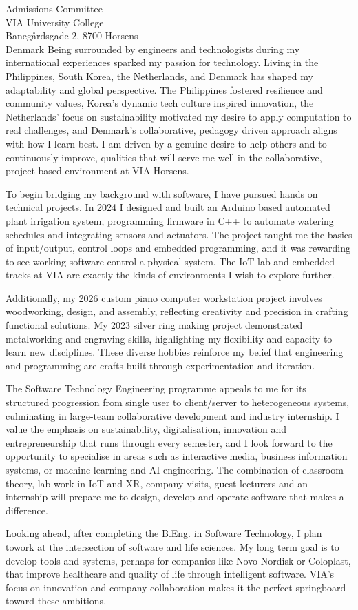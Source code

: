 \documentclass[11pt,a4paper]{letter}
\begin{document}
\begin{letter}{Admissions Committee \\ VIA University College \\ Banegårdsgade 2, 8700 Horsens \\ Denmark}
Being surrounded by engineers and technologists during my international experiences sparked my passion for technology. Living in the Philippines, South Korea, the Netherlands, and Denmark has shaped my adaptability and global perspective. The Philippines fostered resilience and community values, Korea's dynamic tech culture inspired innovation, the Netherlands' focus on sustainability motivated my desire to apply computation to real challenges, and Denmark's collaborative, pedagogy driven approach aligns with how I learn best. I am driven by a genuine desire to help others and to continuously improve, qualities that will serve me well in the collaborative, project based environment at VIA Horsens.

To begin bridging my background with software, I have pursued hands on technical projects. In 2024 I designed and built an Arduino based automated plant irrigation system, programming firmware in C++ to automate watering schedules and integrating sensors and actuators. The project taught me the basics of input/output, control loops and embedded programming, and it was rewarding to see working software control a physical system. The IoT lab and embedded tracks at VIA are exactly the kinds of environments I wish to explore further.

Additionally, my 2026 custom piano computer workstation project involves woodworking, design, and assembly, reflecting creativity and precision in crafting functional solutions. My 2023 silver ring making project demonstrated metalworking and engraving skills, highlighting my flexibility and capacity to learn new disciplines. These diverse hobbies reinforce my belief that engineering and programming are crafts built through experimentation and iteration.

The Software Technology Engineering programme appeals to me for its structured progression from single user to client/server to heterogeneous systems, culminating in large-team collaborative development and industry internship. I value the emphasis on sustainability, digitalisation, innovation and entrepreneurship that runs through every semester, and I look forward to the opportunity to specialise in areas such as interactive media, business information systems, or machine learning and AI engineering. The combination of classroom theory, lab work in IoT and XR, company visits, guest lecturers and an internship will prepare me to design, develop and operate software that makes a difference.

Looking ahead, after completing the B.Eng. in Software Technology, I plan towork at the intersection of software and life sciences. My long term goal is to develop tools and systems, perhaps for companies like Novo Nordisk or Coloplast, that improve healthcare and quality of life through intelligent software. VIA's focus on innovation and company collaboration makes it the perfect springboard toward these ambitions.


\end{letter}
\end{document}
